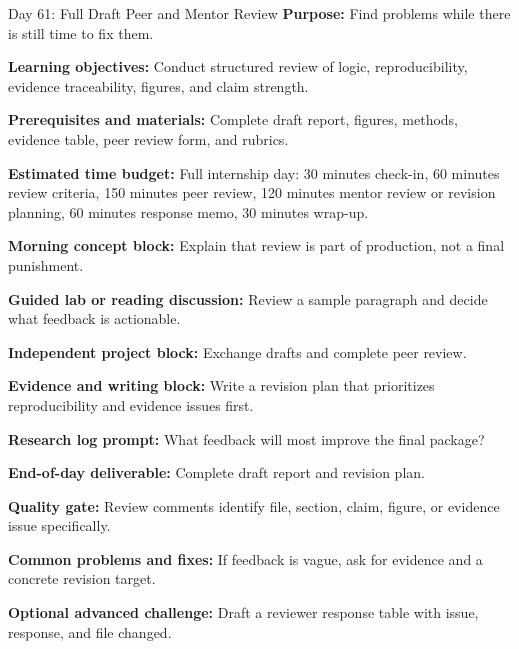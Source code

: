 \begin{dailybox}{Day 61: Full Draft Peer and Mentor Review}
\textbf{Purpose:} Find problems while there is still time to fix them.

\textbf{Learning objectives:} Conduct structured review of logic, reproducibility, evidence traceability, figures, and claim strength.

\textbf{Prerequisites and materials:} Complete draft report, figures, methods, evidence table, peer review form, and rubrics.

\textbf{Estimated time budget:} Full internship day: 30 minutes check-in, 60 minutes review criteria, 150 minutes peer review, 120 minutes mentor review or revision planning, 60 minutes response memo, 30 minutes wrap-up.

\textbf{Morning concept block:} Explain that review is part of production, not a final punishment.

\textbf{Guided lab or reading discussion:} Review a sample paragraph and decide what feedback is actionable.

\textbf{Independent project block:} Exchange drafts and complete peer review.

\textbf{Evidence and writing block:} Write a revision plan that prioritizes reproducibility and evidence issues first.

\textbf{Research log prompt:} What feedback will most improve the final package?

\textbf{End-of-day deliverable:} Complete draft report and revision plan.

\textbf{Quality gate:} Review comments identify file, section, claim, figure, or evidence issue specifically.

\textbf{Common problems and fixes:} If feedback is vague, ask for evidence and a concrete revision target.

\textbf{Optional advanced challenge:} Draft a reviewer response table with issue, response, and file changed.
\end{dailybox}

